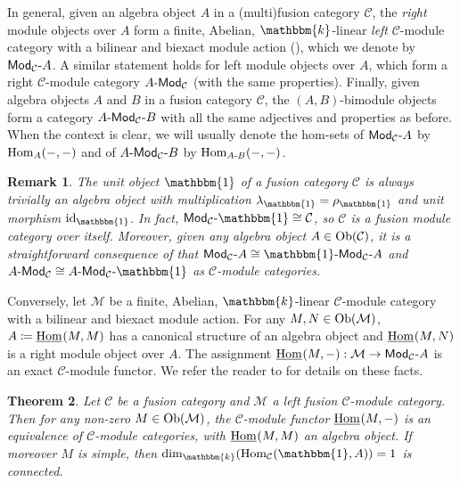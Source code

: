 \documentclass[12pt, reqno]{amsart}
\numberwithin{equation}{section}
\theoremstyle{plainspace}
\newtheorem{theorem}{Theorem}[section]
\theoremstyle{definitionspace}
\theoremstyle{remarkspace}
\newtheorem{remark}[theorem]{Remark}
\newcommand{\id}{\textup{id}}
\newcommand{\mathcat}[1]{\mathcal{#1}}
\newcommand{\Ob}{\textup{Ob}}
\newcommand{\Hom}[2][]{
	\ifthenelse{\equal{#2}{}}
		{\textup{Hom}_{#1}}
		{\textup{Hom}_{#1}\!\left(#2\right)}
}
\newcommand{\IntHom}[2][]{
	\ifthenelse{\equal{#2}{}}
		{\underline{\textup{Hom}}_{#1}}
		{\underline{\textup{Hom}}_{#1}\!\left(#2\right)}
}
\newcommand{\textcat}[1]{\textup{\textsf{#1}}}
\newcommand{\rmodcat}[2][]{\textcat{Mod}_{#1}\textcat{-}#2}
\newcommand{\lmodcat}[2][]{#2\textcat{-Mod}_{#1}}
\newcommand{\bimodcat}[3][]{#2\textcat{-Mod}_{#1}\textcat{-}#3}
\begin{document}
\noindent In general, given an algebra object $A$ in a (multi)fusion category $\mathcat{C}$, the {\em right} module objects over $A$ form a finite, Abelian, $\mathbbm{k}$-linear {\em left} $\mathcat{C}$-module category with a bilinear and biexact module action (\cite[Chapter 7.8]{Etingof_2016}), which we denote by $\rmodcat[\mathcat{C}]{A}$. A similar statement holds for left module objects over $A$, which form a right $\mathcat{C}$-module category $\lmodcat[\mathcat{C}]{A}$ (with the same properties). Finally, given algebra objects $A$ and $B$ in a fusion category $\mathcat{C}$, the $(A, B)$-bimodule objects form a category $\bimodcat[\mathcat{C}]{A}{B}$ with all the same adjectives and properties as before. When the context is clear, we will usually denote the hom-sets of $\rmodcat[\mathcat{C}]{A}$ by $\Hom[A]{-, -}$ and of $\bimodcat[\mathcat{C}]{A}{B}$ by $\Hom[A\textup{-}B]{-, -}$.
\newline

\begin{remark}\label{rem:trivial_module}
The unit object $\mathbbm{1}$ of a fusion category $\mathcat{C}$ is always trivially an algebra object with multiplication $\lambda_{\mathbbm{1}} = \rho_{\mathbbm{1}}$ and unit morphism $\id_{\mathbbm{1}}$. In fact, $\rmodcat[\mathcat{C}]{\mathbbm{1}} \cong \mathcat{C}$, so $\mathcat{C}$ is a fusion module category over itself. Moreover, given any algebra object $A \in \Ob(\mathcat{C})$, it is a straightforward consequence of \cite[Proposition 2.2.4]{Etingof_2016} that $\rmodcat[\mathcat{C}]{A} \cong \bimodcat[\mathcat{C}]{\mathbbm{1}}{A}$ and $\lmodcat[\mathcat{C}]{A} \cong \bimodcat[\mathcat{C}]{A}{\mathbbm{1}}$ as $\mathcat{C}$-module categories.
\end{remark}
\leavevmode

\noindent Conversely, let $\mathcat{M}$ be a finite, Abelian, $\mathbbm{k}$-linear $\mathcat{C}$-module category with a bilinear and biexact module action. For any $M, N \in \Ob(\mathcat{M})$, $A \coloneqq \IntHom{M, M}$ has a canonical structure of an algebra object and $\IntHom{M, N}$ is a right module object over $A$. The assignment $\IntHom{M, -} : \mathcat{M} \to \rmodcat[\mathcat{C}]{A}$ is an exact $\mathcat{C}$-module functor. We refer the reader to \cite[Section 7.9]{Etingof_2016} for details on these facts.
\newline

\begin{theorem}\label{thm:modules_from_algebras} \cite[Theorem 1]{Ostrik_2003}
Let $\mathcat{C}$ be a fusion category and $\mathcat{M}$ a left fusion $\mathcat{C}$-module category. Then for any non-zero $M \in \Ob(\mathcat{M})$, the $\mathcat{C}$-module functor $\IntHom{M, -}$ is an equivalence of $\mathcat{C}$-module categories, with $\IntHom{M, M}$ an algebra object. If moreover $M$ is simple, then $\dim_{\mathbbm{k}}(\Hom[\mathcat{C}]{\mathbbm{1}, A}) = 1$ is connected.
\end{theorem}
\leavevmode
\end{document}
